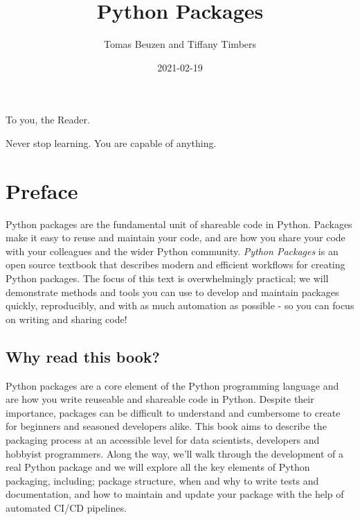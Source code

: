 \documentclass[
]{krantz}
\title{Python Packages}
\author{Tomas Beuzen and Tiffany Timbers}
\date{2021-02-19}
\begin{document}
\maketitle


\thispagestyle{empty}

\begin{center}
To you, the Reader.

Never stop learning. You are capable of anything.
\end{center}

\setlength{\abovedisplayskip}{-5pt}
\setlength{\abovedisplayshortskip}{-5pt}

{
\hypersetup{linkcolor=}
\setcounter{tocdepth}{2}
\tableofcontents
}
\listoftables
\listoffigures
\hypertarget{preface}{%
\chapter*{Preface}\label{preface}}


Python packages are the fundamental unit of shareable code in Python. Packages make it easy to reuse and maintain your code, and are how you share your code with your colleagues and the wider Python community. \emph{Python Packages} is an open source textbook that describes modern and efficient workflows for creating Python packages. The focus of this text is overwhelmingly practical; we will demonstrate methods and tools you can use to develop and maintain packages quickly, reproducibly, and with as much automation as possible - so you can focus on writing and sharing code!

\hypertarget{why-read-this-book}{%
\section*{Why read this book?}\label{why-read-this-book}}


Python packages are a core element of the Python programming language and are how you write reuseable and shareable code in Python. Despite their importance, packages can be difficult to understand and cumbersome to create for beginners and seasoned developers alike. This book aims to describe the packaging process at an accessible level for data scientists, developers and hobbyist programmers. Along the way, we'll walk through the development of a real Python package and we will explore all the key elements of Python packaging, including; package structure, when and why to write tests and documentation, and how to maintain and update your package with the help of automated CI/CD pipelines.
\end{document}
